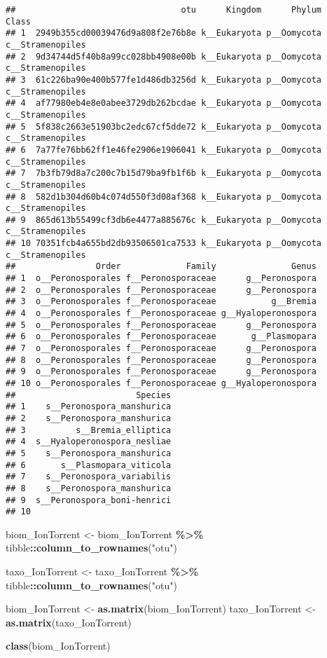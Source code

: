\documentclass[
]{article}
\newenvironment{Shaded}{\begin{snugshade}}{\end{snugshade}}
\newcommand{\FunctionTok}[1]{\textcolor[rgb]{0.13,0.29,0.53}{\textbf{#1}}}
\newcommand{\NormalTok}[1]{#1}
\newcommand{\OtherTok}[1]{\textcolor[rgb]{0.56,0.35,0.01}{#1}}
\newcommand{\SpecialCharTok}[1]{\textcolor[rgb]{0.81,0.36,0.00}{\textbf{#1}}}
\newcommand{\StringTok}[1]{\textcolor[rgb]{0.31,0.60,0.02}{#1}}
\begin{document}
\begin{verbatim}
##                                 otu      Kingdom      Phylum            Class
## 1  2949b355cd00039476d9a808f2e76b8e k__Eukaryota p__Oomycota c__Stramenopiles
## 2  9d34744d5f40b8a99cc028bb4908e00b k__Eukaryota p__Oomycota c__Stramenopiles
## 3  61c226ba90e400b577fe1d486db3256d k__Eukaryota p__Oomycota c__Stramenopiles
## 4  af77980eb4e8e0abee3729db262bcdae k__Eukaryota p__Oomycota c__Stramenopiles
## 5  5f838c2663e51903bc2edc67cf5dde72 k__Eukaryota p__Oomycota c__Stramenopiles
## 6  7a77fe76bb62ff1e46fe2906e1906041 k__Eukaryota p__Oomycota c__Stramenopiles
## 7  7b3fb79d8a7c200c7b15d79ba9fb1f6b k__Eukaryota p__Oomycota c__Stramenopiles
## 8  582d1b304d60b4c074d550f3d08af368 k__Eukaryota p__Oomycota c__Stramenopiles
## 9  865d613b55499cf3db6e4477a885676c k__Eukaryota p__Oomycota c__Stramenopiles
## 10 70351fcb4a655bd2db93506501ca7533 k__Eukaryota p__Oomycota c__Stramenopiles
##                Order             Family               Genus
## 1  o__Peronosporales f__Peronosporaceae      g__Peronospora
## 2  o__Peronosporales f__Peronosporaceae      g__Peronospora
## 3  o__Peronosporales f__Peronosporaceae           g__Bremia
## 4  o__Peronosporales f__Peronosporaceae g__Hyaloperonospora
## 5  o__Peronosporales f__Peronosporaceae      g__Peronospora
## 6  o__Peronosporales f__Peronosporaceae       g__Plasmopara
## 7  o__Peronosporales f__Peronosporaceae      g__Peronospora
## 8  o__Peronosporales f__Peronosporaceae      g__Peronospora
## 9  o__Peronosporales f__Peronosporaceae      g__Peronospora
## 10 o__Peronosporales f__Peronosporaceae g__Hyaloperonospora
##                        Species
## 1    s__Peronospora_manshurica
## 2    s__Peronospora_manshurica
## 3          s__Bremia_elliptica
## 4  s__Hyaloperonospora_nesliae
## 5    s__Peronospora_manshurica
## 6       s__Plasmopara_viticola
## 7    s__Peronospora_variabilis
## 8    s__Peronospora_manshurica
## 9  s__Peronospora_boni-henrici
## 10
\end{verbatim}

\begin{Shaded}
\begin{Highlighting}[]
\NormalTok{biom\_IonTorrent }\OtherTok{\textless{}{-}}\NormalTok{ biom\_IonTorrent }\SpecialCharTok{\%\textgreater{}\%}
\NormalTok{  tibble}\SpecialCharTok{::}\FunctionTok{column\_to\_rownames}\NormalTok{(}\StringTok{"otu"}\NormalTok{) }

\NormalTok{taxo\_IonTorrent }\OtherTok{\textless{}{-}}\NormalTok{ taxo\_IonTorrent }\SpecialCharTok{\%\textgreater{}\%}
\NormalTok{  tibble}\SpecialCharTok{::}\FunctionTok{column\_to\_rownames}\NormalTok{(}\StringTok{"otu"}\NormalTok{) }


\NormalTok{biom\_IonTorrent }\OtherTok{\textless{}{-}} \FunctionTok{as.matrix}\NormalTok{(biom\_IonTorrent)}
\NormalTok{taxo\_IonTorrent }\OtherTok{\textless{}{-}} \FunctionTok{as.matrix}\NormalTok{(taxo\_IonTorrent)}

\FunctionTok{class}\NormalTok{(biom\_IonTorrent)}
\end{Highlighting}
\end{Shaded}
\end{document}
